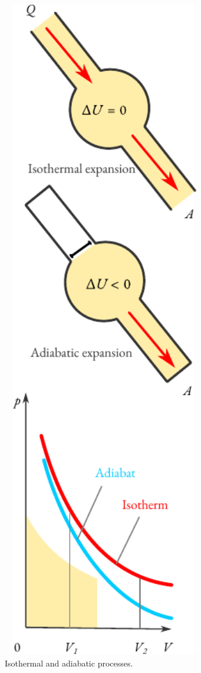 \begin{figure}%
\centering
\includegraphics[width=0.8\textwidth]{figures/isotherm-adia.pdf}
\caption{Isothermal and adiabatic processes.\label{iso-adia}}
\end{figure}


